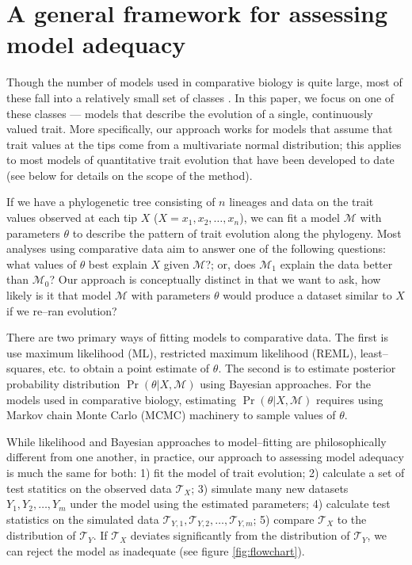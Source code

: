\documentclass[a4paper,11pt]{article}
\begin{document}
\section{A general framework for assessing model adequacy}
Though the number of models used in comparative biology is quite large, most of these fall into a relatively small set of classes \citep{Omeara2012}. In this paper, we focus on one of these classes --- models that describe the evolution of a single, continuously valued trait. More specifically, our approach works for models that assume that trait values at the tips come from a multivariate normal distribution; this applies to most models of quantitative trait evolution that have been developed to date (see below for details on the scope of the method).

If we have a phylogenetic tree consisting of $n$ lineages and data on the trait values observed at each tip $X$ ($X=x_1, x_2, \ldots, x_n$), we can fit a model $\mathcal{M}$ with parameters $\theta$ to describe the pattern of trait evolution along the phylogeny. Most analyses using comparative data aim to answer one of the following questions: what values of $\theta$ best explain $X$ given $\mathcal{M}$?; or, does $\mathcal{M}_1$ explain the data better than $\mathcal{M}_0$? Our approach is conceptually distinct in that we want to ask, how likely is it that model $\mathcal{M}$ with parameters $\theta$ would produce a dataset similar to $X$ if we re--ran evolution?

There are two primary ways of fitting models to comparative data. The first is use maximum likelihood (ML), restricted maximum likelihood (REML), least--squares, etc. to obtain a point estimate of $\theta$. The second is to estimate posterior probability distribution $\Pr(\theta|X, \mathcal{M})$ using Bayesian approaches.
For the models used in comparative biology, estimating $\Pr(\theta|X, \mathcal{M})$ requires using Markov chain Monte Carlo (MCMC) machinery to sample values of $\theta$.   

While likelihood and Bayesian approaches to model--fitting are philosophically different from one another, in practice, our approach to assessing model adequacy is much the same for both: 1) fit the model of trait evolution; 2) calculate a set of test statitics on the observed data $\mathcal{T}_X$; 3) simulate many new datasets $Y_1, Y_2, \ldots, Y_m$ under the model using the estimated parameters; 4) calculate test statistics on the simulated data $\mathcal{T}_{Y,1}, \mathcal{T}_{Y,2}, \ldots, \mathcal{T}_{Y,m}$; 5) compare $\mathcal{T}_X$ to the distribution of $\mathcal{T}_Y$. If $\mathcal{T}_X$ deviates significantly from the distribution of $\mathcal{T}_Y$, we can reject the model as inadequate (see figure \ref{fig:flowchart}).
\end{document}
